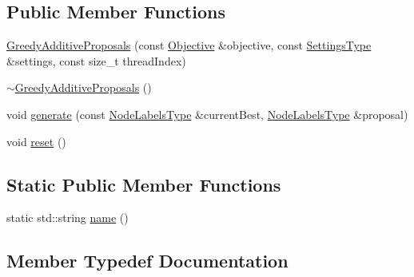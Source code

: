 \subsection*{Public Member Functions}
\begin{DoxyCompactItemize}
\item 
\hyperlink{classnifty_1_1graph_1_1optimization_1_1multicut_1_1GreedyAdditiveProposals_a9db939c0978bcf0ea35e47bbdd67ea12}{Greedy\+Additive\+Proposals} (const \hyperlink{classnifty_1_1graph_1_1optimization_1_1multicut_1_1GreedyAdditiveProposals_adfd52c9823ecb5022d236498f48fe847}{Objective} \&objective, const \hyperlink{structnifty_1_1graph_1_1optimization_1_1multicut_1_1GreedyAdditiveProposals_1_1SettingsType}{Settings\+Type} \&settings, const size\+\_\+t thread\+Index)
\item 
\hyperlink{classnifty_1_1graph_1_1optimization_1_1multicut_1_1GreedyAdditiveProposals_aa9ce3253b6cf31af23afb112012f2458}{$\sim$\+Greedy\+Additive\+Proposals} ()
\item 
void \hyperlink{classnifty_1_1graph_1_1optimization_1_1multicut_1_1GreedyAdditiveProposals_a992f837061b450a770dfdffc7bbd1977}{generate} (const \hyperlink{classnifty_1_1graph_1_1optimization_1_1multicut_1_1GreedyAdditiveProposals_a871cac211effbd727baf2cadd76c844d}{Node\+Labels\+Type} \&current\+Best, \hyperlink{classnifty_1_1graph_1_1optimization_1_1multicut_1_1GreedyAdditiveProposals_a871cac211effbd727baf2cadd76c844d}{Node\+Labels\+Type} \&proposal)
\item 
void \hyperlink{classnifty_1_1graph_1_1optimization_1_1multicut_1_1GreedyAdditiveProposals_adeffdfd170e1b7aa163e4da74f91713a}{reset} ()
\end{DoxyCompactItemize}
\subsection*{Static Public Member Functions}
\begin{DoxyCompactItemize}
\item 
static std\+::string \hyperlink{classnifty_1_1graph_1_1optimization_1_1multicut_1_1GreedyAdditiveProposals_ad390e118cd8375e85b1539df7920642a}{name} ()
\end{DoxyCompactItemize}


\subsection{Member Typedef Documentation}
\hypertarget{classnifty_1_1graph_1_1optimization_1_1multicut_1_1GreedyAdditiveProposals_a80c4717b494cd77ddb07589ed451956c}{}
